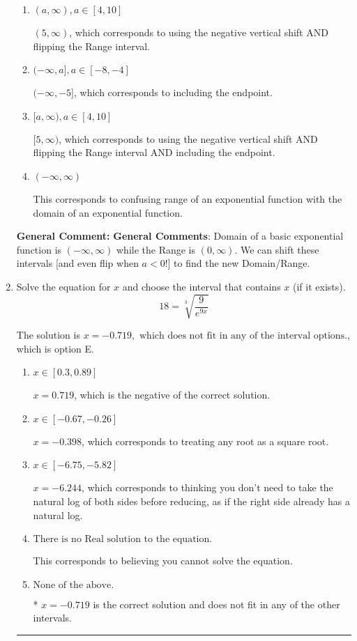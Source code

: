 \documentclass{extbook}[14pt]
\newcommand{\litem}[1]{\item #1

\rule{\textwidth}{0.4pt}}
\begin{document}
\begin{enumerate}
{\begin{enumerate}[label=\Alph*.]
* $(-\infty, -5)$, which is the correct option.
\item \( (a, \infty), a \in [4, 10] \)

$(5, \infty)$, which corresponds to using the negative vertical shift AND flipping the Range interval.
\item \( (-\infty, a], a \in [-8, -4] \)

$(-\infty, -5]$, which corresponds to including the endpoint.
\item \( [a, \infty), a \in [4, 10] \)

$[5, \infty)$, which corresponds to using the negative vertical shift AND flipping the Range interval AND including the endpoint.
\item \( (-\infty, \infty) \)

This corresponds to confusing range of an exponential function with the domain of an exponential function.
\end{enumerate}

\textbf{General Comment:} \textbf{General Comments}: Domain of a basic exponential function is $(-\infty, \infty)$ while the Range is $(0, \infty)$. We can shift these intervals [and even flip when $a<0$!] to find the new Domain/Range.
}
\litem{
 Solve the equation for $x$ and choose the interval that contains $x$ (if it exists).
\[  18 = \sqrt[3]{\frac{9}{e^{9x}}} \]

The solution is \( x = -0.719, \text{ which does not fit in any of the interval options.} \), which is option E.\begin{enumerate}[label=\Alph*.]
\item \( x \in [0.3, 0.89] \)

$x = 0.719$, which is the negative of the correct solution.
\item \( x \in [-0.67, -0.26] \)

$x = -0.398$, which corresponds to treating any root as a square root.
\item \( x \in [-6.75, -5.82] \)

$x = -6.244$, which corresponds to thinking you don't need to take the natural log of both sides before reducing, as if the right side already has a natural log.
\item \( \text{There is no Real solution to the equation.} \)

This corresponds to believing you cannot solve the equation.
\item \( \text{None of the above.} \)

* $x = -0.719$ is the correct solution and does not fit in any of the other intervals.
\end{enumerate}

}
\end{enumerate}
\end{document}
